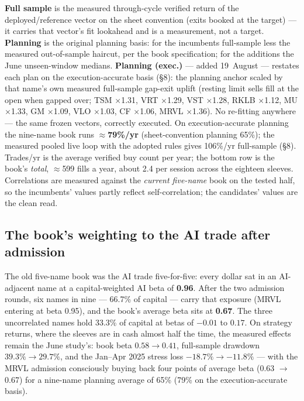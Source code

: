 \documentclass[11pt,a4paper]{article}
\newcommand{\tabnote}[1]{\begin{center}\begin{minipage}{0.92\textwidth}
  \footnotesize\color{bcgrey}#1\end{minipage}\end{center}}
\begin{document}
\tabnote{\textbf{Full sample} is the measured through-cycle verified return of the
deployed/reference vector on the sheet convention (exits booked at the target) ---
it carries that vector's fit lookahead and is a measurement, not a target.
\textbf{Planning} is the original planning basis: for the incumbents full-sample
less the measured out-of-sample haircut, per the book specification; for the
additions the June unseen-window medians. \textbf{Planning (exec.)} --- added
19~August --- restates each plan on the execution-accurate basis (\S8): the
planning anchor scaled by that name's own measured full-sample gap-exit uplift
(resting limit sells fill at the open when gapped over; TSM $\times$1.31, VRT
$\times$1.29, VST $\times$1.28, RKLB $\times$1.12, MU $\times$1.33, GM
$\times$1.09, VLO $\times$1.03, CF $\times$1.06, MRVL $\times$1.36). No
re-fitting anywhere --- the same frozen vectors, correctly executed. On
execution-accurate planning the nine-name book runs
$\approx$\textbf{79\%/yr} (sheet-convention planning 65\%); the measured pooled
live loop with the adopted rules gives 106\%/yr full-sample (\S8). Trades/yr is
the average verified buy count per year; the bottom row is the book's
\emph{total}, $\approx$599 fills a year, about 2.4 per session across the
eighteen sleeves. Correlations are measured against the \emph{current
five-name} book on the tested half, so the incumbents' values partly reflect
self-correlation; the candidates' values are the clean read.}

\subsection{The book's weighting to the AI trade after admission}

The old five-name book was the AI trade five-for-five: every dollar sat in an
AI-adjacent name at a capital-weighted AI beta of \textbf{0.96}. After the two
admission rounds, six names in nine --- 66.7\% of capital --- carry that exposure
(MRVL entering at beta 0.95), and the book's average beta sits at \textbf{0.67}.
The three uncorrelated names hold 33.3\% of capital at betas of $-0.01$ to
$0.17$. On strategy returns, where the sleeves are in cash almost half the time,
the measured effects remain the June study's: book beta $0.58 \to 0.41$,
full-sample drawdown $39.3\% \to 29.7\%$, and the Jan--Apr 2025 stress loss
$-18.7\% \to -11.8\%$ --- with the MRVL admission consciously buying back four
points of average beta (0.63 $\to$ 0.67) for a nine-name planning average of
65\% (79\% on the execution-accurate basis).
\end{document}
